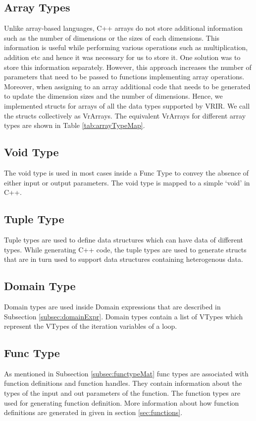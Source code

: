 \subsection{Array Types}
Unlike array-based languages, C++ arrays do not store additional information such as the number of dimensions or the sizes of each dimensions. This information is useful while performing various operations such as multiplication, addition etc and hence it was necessary for us to store it. One solution was to store this information separately. However, this approach increases the number of parameters that need to be passed to functions implementing array operations. Moreover, when assigning to an array additional code that needs to be generated to update the dimension sizes and the number of dimensions. Hence, we implemented structs for arrays of all the data types supported by VRIR. We call the structs collectively as VrArrays. The equivalent VrArrays for different array types are shown in Table \ref{tab:arrayTypeMap}.

\subsection{Void Type}
The void type is used in most cases inside a Func Type to convey the absence of either input or output parameters. The void type is mapped to a simple `void' in C++.
\subsection{Tuple Type}
Tuple types are used to define data structures which can have data of different types. While generating C++ code, the tuple types are used to generate structs that are in turn used to support data structures containing heterogenous data.
\subsection{Domain Type}
Domain types are used inside Domain expressions that are described in Subsection \ref{subsec:domainExpr}. Domain types contain a list of VTypes which represent the VTypes of the iteration variables of a loop. 
\subsection{Func Type}
As mentioned in Subsection \ref{subsec:functypeMat} func types are associated with function definitions and function handles. They contain information about the types of the input and out parameters of the function. The function types are used for generating function definition. More information about how function definitions are generated in given in section \ref{sec:functions}.
